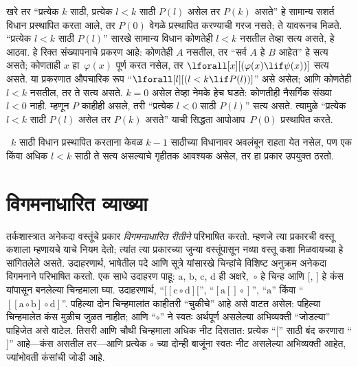 खरे तर “प्रत्येक $k$ साठी, प्रत्येक $l<k$ साठी $P(l)$ असेल तर $P(k)$ असते” हे सामान्य सशर्त विधान प्रस्थापित करता आले, तर $P(0)$ वेगळे प्रस्थापित करण्याची गरज नसते; ते यावरूनच मिळते. “प्रत्येक $l<k$ साठी $P(l)$” सारखे सामान्य विधान कोणतेही $l<k$ नसतील तेव्हा सत्य असते, हे आठवा. हे रिक्त संख्यापनाचे प्रकरण आहे: कोणतेही $A$ नसतील, तर “सर्व $A$ हे $B$ आहेत” हे सत्य असते; कोणताही $x$ हा~$\varphi(x)$ पूर्ण करत नसेल, तर $\lforall[x][(\varphi(x) \lif \psi(x))]$ सत्य असते. या प्रकरणात औपचारिक रूप “$\lforall[l][(l < k \lif P(l))]$” असे असेल; आणि कोणतेही $l < k$ नसतील, तर ते सत्य असते. $k=0$ असेल तेव्हा नेमके हेच घडते: कोणतीही नैसर्गिक संख्या $l<0$ नाही. म्हणून $P$ काहीही असले, तरी “प्रत्येक $l<0$ साठी $P(l)$” सत्य असते. त्यामुळे “प्रत्येक $l<k$ साठी $P(l)$ असेल तर $P(k)$ असते” याची सिद्धता आपोआप~$P(0)$ प्रस्थापित करते.

~$k$ साठी विधान प्रस्थापित करताना केवळ $k-1$ साठीच्या विधानावर अवलंबून राहता येत नसेल, पण एक किंवा अधिक $l<k$ साठी ते सत्य असल्याचे गृहीतक आवश्यक असेल, तर हा प्रकार उपयुक्त ठरतो.












\section{विगमनाधारित व्याख्या}\label{mth:ind:idf:sec}

तर्कशास्त्रात अनेकदा वस्तूंचे प्रकार \emph{विगमनाधारित रीतीने} परिभाषित करतो. म्हणजे त्या प्रकारची वस्तू कशाला म्हणायचे याचे नियम देतो; त्यांत त्या प्रकारच्या जुन्या वस्तूंपासून नव्या वस्तू कशा मिळवायच्या हे सांगितलेले असते. उदाहरणार्थ, भाषेतील पदे आणि सूत्रे यांसारखे चिन्हांचे विशिष्ट अनुक्रम अनेकदा विगमनाने परिभाषित करतो. एक साधे उदाहरण पाहू: $\mathrm{a}$, $\mathrm{b}$, $\mathrm{c}$, $\mathrm{d}$ ही अक्षरे,~$\circ$ हे चिन्ह आणि $[$, $]$ हे कंस यांपासून बनलेल्या चिन्हमाला घ्या. उदाहरणार्थ, “$[[\mathrm{c} \circ \mathrm{d}][$”, “$[\mathrm{a}[]\circ]$”, “$\mathrm{a}$” किंवा “$[[\mathrm{a} \circ \mathrm{b}]\circ \mathrm{d}]$”. पहिल्या दोन चिन्हमालांत काहीतरी “चुकीचे” आहे असे वाटत असेल: पहिल्या चिन्हमालेत कंस मुळीच जुळत नाहीत; आणि “$\circ$” ने स्वतः अर्थपूर्ण असलेल्या अभिव्यक्ती “जोडल्या” पाहिजेत असे वाटेल. तिसरी आणि चौथी चिन्हमाला अधिक नीट दिसतात: प्रत्येक “$[$” साठी बंद करणारा “$]$” आहे---कंस असतील तर---आणि प्रत्येक $\circ$ च्या दोन्ही बाजूंना स्वतः नीट असलेल्या अभिव्यक्ती आहेत, ज्यांभोवती कंसांची जोडी आहे.

